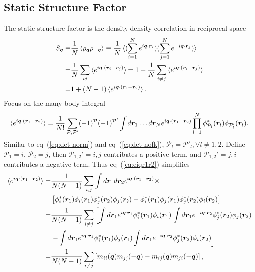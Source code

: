 \subsection{Static Structure Factor}
\label{sec:wf-pw-sdet-sk}
The static structure factor is the density-density correlation in reciprocal space
\begin{align}
S_{\boldsymbol{q}} \equiv& \frac{1}{N}\braket{\rho_{\boldsymbol{q}}\rho_{-\boldsymbol{q}}} \equiv
\frac{1}{N}\braket{
(\sum\limits_{i=1}^N e^{i\boldsymbol{q}\cdot\boldsymbol{r}_i})
(\sum\limits_{j=1}^N e^{-i\boldsymbol{q}\cdot\boldsymbol{r}_j})
} \nonumber \\
=& \frac{1}{N}\sum_{ij}\braket{e^{i\boldsymbol{q}\cdot(\boldsymbol{r}_i-\boldsymbol{r}_j)}} =
1 + \frac{1}{N}\sum_{i\neq j}\braket{e^{i\boldsymbol{q}\cdot(\boldsymbol{r}_i-\boldsymbol{r}_j)}} \nonumber \\
=& 1+(N-1)\braket{e^{i\boldsymbol{q}\cdot(\boldsymbol{r}_1-\boldsymbol{r}_2)}}.
\end{align}
Focus on the many-body integral
\begin{align}
\braket{e^{i\boldsymbol{q}\cdot(\boldsymbol{r}_1-\boldsymbol{r}_2)}} = \dfrac{1}{N!} \sum\limits_{\mathcal{P},\mathcal{P'}} 
(-1)^{\mathcal{P}} (-1)^{\mathcal{P'}} \int d\boldsymbol{r}_1\dots d\boldsymbol{r}_N
e^{i\boldsymbol{q}\cdot(\boldsymbol{r}_1-\boldsymbol{r}_2)}
\prod\limits_{l=1}^{N} \phi^*_{\mathcal{P}_l}(\boldsymbol{r}_l)\phi_{\mathcal{P}_l'}(\boldsymbol{r}_l). \label{eq:eiqr1r2}
\end{align}
Similar to eq~(\ref{eq:det-norm}) and eq~(\ref{eq:det-nofk}), $\mathcal{P}_l=\mathcal{P}'_l, \forall l\neq1, 2$. Define $\mathcal{P}_1=i$, $\mathcal{P}_2=j$, then $\mathcal{P}_{1,2}'=i, j$ contributes a positive term, and $\mathcal{P}_{1,2}'=j, i$ contributes a negative term. Thus eq~(\ref{eq:eiqr1r2}) simplifies
\begin{align}
\braket{e^{i\boldsymbol{q}\cdot(\boldsymbol{r}_1-\boldsymbol{r}_2)}} =& \dfrac{1}{N(N-1)} \sum\limits_{i, j}
 \int d\boldsymbol{r}_1d\boldsymbol{r}_2
e^{i\boldsymbol{q}\cdot(\boldsymbol{r}_1-\boldsymbol{r}_2)} \times \nonumber \\
&\left[
\phi^*_{i}(\boldsymbol{r}_1)\phi_{i}(\boldsymbol{r}_1)\phi^*_{j}(\boldsymbol{r}_2)\phi_{j}(\boldsymbol{r}_2) - 
\phi^*_{i}(\boldsymbol{r}_1)\phi_{j}(\boldsymbol{r}_1)\phi^*_{j}(\boldsymbol{r}_2)\phi_{i}(\boldsymbol{r}_2)
\right] \nonumber \\
=& \dfrac{1}{N(N-1)} \sum\limits_{i\neq j} \left[
\int d\boldsymbol{r}_1 e^{i\boldsymbol{q}\cdot\boldsymbol{r}_1} \phi^*_{i}(\boldsymbol{r}_1)\phi_{i}(\boldsymbol{r}_1) \right.
\int d\boldsymbol{r}_1 e^{-i\boldsymbol{q}\cdot\boldsymbol{r}_2} \phi^*_{j}(\boldsymbol{r}_2)\phi_{j}(\boldsymbol{r}_2) \nonumber \\
& \left. - \int d\boldsymbol{r}_1 e^{i\boldsymbol{q}\cdot\boldsymbol{r}_1} \phi^*_{i}(\boldsymbol{r}_1)\phi_{j}(\boldsymbol{r}_1)
\int d\boldsymbol{r}_1 e^{-i\boldsymbol{q}\cdot\boldsymbol{r}_2} \phi^*_{j}(\boldsymbol{r}_2)\phi_{i}(\boldsymbol{r}_2)
\right] \nonumber \\
=& \dfrac{1}{N(N-1)} \sum\limits_{i\neq j} \left[
m_{ii}(\boldsymbol{q})m_{jj}(-\boldsymbol{q}) - m_{ij}(\boldsymbol{q})m_{ji}(-\boldsymbol{q})
\right],
\end{align}
